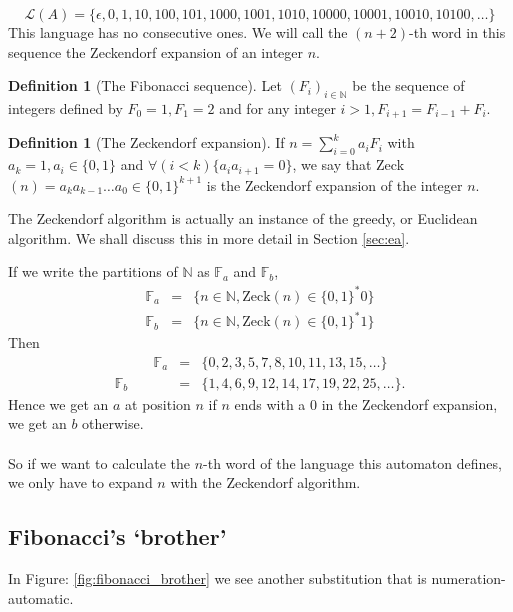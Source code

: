 \documentclass{article}
\theoremstyle{definition}
\newtheorem{definition}[theorem]{Definition}
\begin{document}
\begin{displaymath}
\mathcal{L}(A) = \{\epsilon, 0, 1, 10, 100, 101, 1000, 1001, 1010, 10000, 
10001, 10010, 10100, \ldots\}
\end{displaymath}
This language has no consecutive ones. We will call the $(n + 2)$-th word in 
this sequence the Zeckendorf expansion of an integer $n$.

\begin{definition}[The Fibonacci sequence]
Let $(F_i)_{i \in \mathbb{N}}$ be the sequence of integers defined by $F_0 = 1,
F_1 = 2$ and for any integer $i > 1, F_{i + 1} = F_{i - 1} + F_i$.
\end{definition}

\begin{definition}[The Zeckendorf expansion]
If $n = \sum_{i = 0}^k a_i F_i$ with $a_k = 1, a_i \in \{0, 1\}$ and
$\forall (i < k) \{a_i a_{i + 1} = 0\}$, we say that
Zeck$(n) = a_k a_{k - 1} \ldots a_0 \in \{0, 1\}^{k + 1}$ is the Zeckendorf
expansion of the integer $n$.
\end{definition}

The Zeckendorf algorithm is actually an instance of the greedy, or Euclidean
algorithm. We shall discuss this in more detail in Section \ref{sec:ea}.

If we write the partitions of
$\mathbb{N}$ as $\mathbb{F}_a$ and $\mathbb{F}_b$,
\begin{eqnarray*}
  \mathbb{F}_a &=& \{n \in \mathbb{N}, \mathrm{Zeck}(n) \in \{0, 1\}^* 0\}\\
  \mathbb{F}_b &=& \{n \in \mathbb{N}, \mathrm{Zeck}(n) \in \{0, 1\}^* 1\}
\end{eqnarray*}
Then
\begin{eqnarray*}
\;\;\;\;\;\;\;\;\;\;
  \mathbb{F}_a &=& \{0, 2, 3, 5, 7, 8, 10, 11, 13, 15, \ldots\}\\
  \mathbb{F}_b &=& \{1, 4, 6, 9, 12, 14, 17, 19, 22, 25, \ldots\}.
\end{eqnarray*}
Hence we get an $a$ at position $n$ if $n$ ends with a 0 in the
Zeckendorf expansion, we get an $b$ otherwise.\\
\\
So if we want to calculate the $n$-th word of the language this automaton 
defines, we only have to expand $n$ with the Zeckendorf algorithm.

\subsection{Fibonacci's `brother'}
In Figure: \ref{fig:fibonacci_brother} we see another substitution that is 
numeration-automatic.
\end{document}
